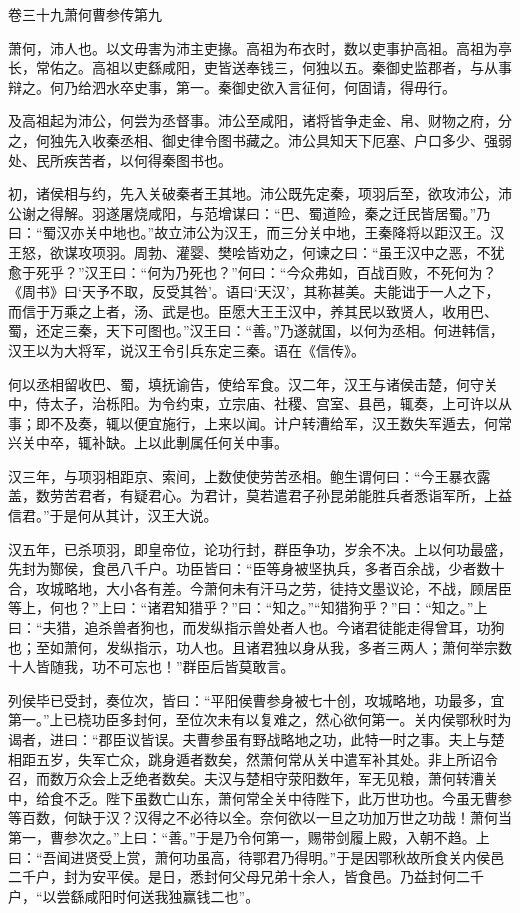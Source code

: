 \documentclass[12pt,UTF8]{ctexbook}
\begin{document}
卷三十九萧何曹参传第九



萧何，沛人也。以文毋害为沛主吏掾。高祖为布衣时，数以吏事护高祖。高祖为亭长，常佑之。高祖以吏繇咸阳，吏皆送奉钱三，何独以五。秦御史监郡者，与从事辩之。何乃给泗水卒史事，第一。秦御史欲入言征何，何固请，得毋行。



及高祖起为沛公，何尝为丞督事。沛公至咸阳，诸将皆争走金、帛、财物之府，分之，何独先入收秦丞相、御史律令图书藏之。沛公具知天下厄塞、户口多少、强弱处、民所疾苦者，以何得秦图书也。



初，诸侯相与约，先入关破秦者王其地。沛公既先定秦，项羽后至，欲攻沛公，沛公谢之得解。羽遂屠烧咸阳，与范增谋曰：“巴、蜀道险，秦之迁民皆居蜀。”乃曰：“蜀汉亦关中地也。”故立沛公为汉王，而三分关中地，王秦降将以距汉王。汉王怒，欲谋攻项羽。周勃、灌婴、樊哙皆劝之，何谏之曰：“虽王汉中之恶，不犹愈于死乎？”汉王曰：“何为乃死也？”何曰：“今众弗如，百战百败，不死何为？《周书》曰‘天予不取，反受其咎’。语曰‘天汉’，其称甚美。夫能诎于一人之下，而信于万乘之上者，汤、武是也。臣愿大王王汉中，养其民以致贤人，收用巴、蜀，还定三秦，天下可图也。”汉王曰：“善。”乃遂就国，以何为丞相。何进韩信，汉王以为大将军，说汉王令引兵东定三秦。语在《信传》。



何以丞相留收巴、蜀，填抚谕告，使给军食。汉二年，汉王与诸侯击楚，何守关中，侍太子，治栎阳。为令约束，立宗庙、社稷、宫室、县邑，辄奏，上可许以从事；即不及奏，辄以便宜施行，上来以闻。计户转漕给军，汉王数失军遁去，何常兴关中卒，辄补缺。上以此剸属任何关中事。



汉三年，与项羽相距京、索间，上数使使劳苦丞相。鲍生谓何曰：“今王暴衣露盖，数劳苦君者，有疑君心。为君计，莫若遣君子孙昆弟能胜兵者悉诣军所，上益信君。”于是何从其计，汉王大说。



汉五年，已杀项羽，即皇帝位，论功行封，群臣争功，岁余不决。上以何功最盛，先封为酂侯，食邑八千户。功臣皆曰：“臣等身被坚执兵，多者百余战，少者数十合，攻城略地，大小各有差。今萧何未有汗马之劳，徒持文墨议论，不战，顾居臣等上，何也？”上曰：“诸君知猎乎？”曰：“知之。”“知猎狗乎？”曰：“知之。”上曰：“夫猎，追杀兽者狗也，而发纵指示兽处者人也。今诸君徒能走得曾耳，功狗也；至如萧何，发纵指示，功人也。且诸君独以身从我，多者三两人；萧何举宗数十人皆随我，功不可忘也！”群臣后皆莫敢言。



列侯毕已受封，奏位次，皆曰：“平阳侯曹参身被七十创，攻城略地，功最多，宜第一。”上已桡功臣多封何，至位次未有以复难之，然心欲何第一。关内侯鄂秋时为谒者，进曰：“郡臣议皆误。夫曹参虽有野战略地之功，此特一时之事。夫上与楚相距五岁，失军亡众，跳身遁者数矣，然萧何常从关中遣军补其处。非上所诏令召，而数万众会上乏绝者数矣。夫汉与楚相守荥阳数年，军无见粮，萧何转漕关中，给食不乏。陛下虽数亡山东，萧何常全关中待陛下，此万世功也。今虽无曹参等百数，何缺于汉？汉得之不必待以全。奈何欲以一旦之功加万世之功哉！萧何当第一，曹参次之。”上曰：“善。”于是乃令何第一，赐带剑履上殿，入朝不趋。上曰：“吾闻进贤受上赏，萧何功虽高，待鄂君乃得明。”于是因鄂秋故所食关内侯邑二千户，封为安平侯。是日，悉封何父母兄弟十余人，皆食邑。乃益封何二千户，“以尝繇咸阳时何送我独赢钱二也”。
\end{document}
